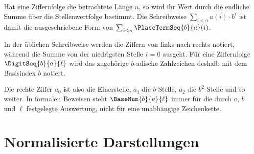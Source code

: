 \documentclass[main.tex]{subfiles}
\begin{document}
Hat eine Ziffernfolge die betrachtete Länge \(n\), so wird ihr Wert durch die
endliche Summe über die Stellenwertfolge bestimmt. Die Schreibweise
\(\sum_{i<n}a(i)\cdot b^i\) ist damit die ausgeschriebene Form von
\(\sum_{i<n}\PlaceTermSeq{b}{a}(i)\).


In der üblichen Schreibweise werden die Ziffern von links nach rechts
notiert, während die Summe von der niedrigsten Stelle \(i=0\) ausgeht. Für
eine Ziffernfolge \(\DigitSeq{b}{a}{\ell}\) wird das zugehörige
\(b\)-adische Zahlzeichen deshalb mit dem Basisindex \(b\) notiert.


Die rechte Ziffer \(a_0\) ist also die Einerstelle, \(a_1\) die \(b\)-Stelle,
\(a_2\) die \(b^2\)-Stelle und so weiter. In formalen Beweisen steht
\(\BaseNum{b}{a}{\ell}\) immer für die durch \(a\), \(b\) und \(\ell\)
festgelegte Auswertung, nicht für eine unabhängige Zeichenkette.

\section{Normalisierte Darstellungen}
\end{document}
